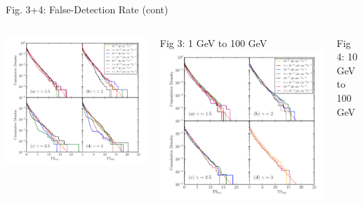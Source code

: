 \documentclass[12pt]{beamer}
\begin{document}
\begin{frame}{Fig. 3+4: False-Detection Rate (cont)}
  \begin{columns}
    \includegraphics[scale=0.35]{plots/ts_ext_emin_1000_color.pdf}


    Fig 3: 1 GeV to 100 GeV
    \includegraphics[scale=0.35]{plots/ts_ext_emin_10000_color.pdf}

    Fig 4: 10 GeV to 100 GeV
  \end{columns}
\end{frame}
\end{document}
